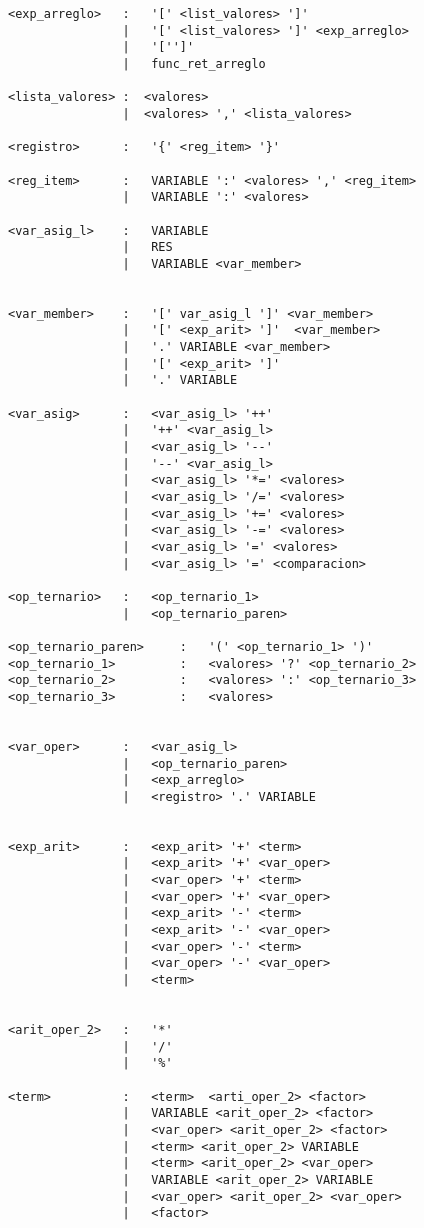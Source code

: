 \begin{verbatim}
<exp_arreglo>   :   '[' <list_valores> ']'
                |   '[' <list_valores> ']' <exp_arreglo>
                |   '['']'
                |   func_ret_arreglo

<lista_valores> :  <valores>
                |  <valores> ',' <lista_valores>

<registro>      :   '{' <reg_item> '}'

<reg_item>      :   VARIABLE ':' <valores> ',' <reg_item>
                |   VARIABLE ':' <valores> 

<var_asig_l>    :   VARIABLE
                |   RES
                |   VARIABLE <var_member>


<var_member>    :   '[' var_asig_l ']' <var_member>
                |   '[' <exp_arit> ']'  <var_member>
                |   '.' VARIABLE <var_member>
                |   '[' <exp_arit> ']' 
                |   '.' VARIABLE 

<var_asig>      :   <var_asig_l> '++'
                |   '++' <var_asig_l>
                |   <var_asig_l> '--'
                |   '--' <var_asig_l>
                |   <var_asig_l> '*=' <valores>
                |   <var_asig_l> '/=' <valores>
                |   <var_asig_l> '+=' <valores>
                |   <var_asig_l> '-=' <valores>
                |   <var_asig_l> '=' <valores>
                |   <var_asig_l> '=' <comparacion>

<op_ternario>   :   <op_ternario_1>
                |   <op_ternario_paren>
                
<op_ternario_paren>     :   '(' <op_ternario_1> ')'
<op_ternario_1>         :   <valores> '?' <op_ternario_2>
<op_ternario_2>         :   <valores> ':' <op_ternario_3>
<op_ternario_3>         :   <valores>


<var_oper>      :   <var_asig_l>
                |   <op_ternario_paren>
                |   <exp_arreglo>
                |   <registro> '.' VARIABLE 

 
<exp_arit>      :   <exp_arit> '+' <term>
                |   <exp_arit> '+' <var_oper>
                |   <var_oper> '+' <term>
                |   <var_oper> '+' <var_oper>
                |   <exp_arit> '-' <term>
                |   <exp_arit> '-' <var_oper>
                |   <var_oper> '-' <term>
                |   <var_oper> '-' <var_oper>
                |   <term>


<arit_oper_2>   :   '*'
                |   '/'
                |   '%'

<term>          :   <term>  <arti_oper_2> <factor>
                |   VARIABLE <arit_oper_2> <factor>
                |   <var_oper> <arit_oper_2> <factor>
                |   <term> <arit_oper_2> VARIABLE
                |   <term> <arit_oper_2> <var_oper>
                |   VARIABLE <arit_oper_2> VARIABLE
                |   <var_oper> <arit_oper_2> <var_oper> 
                |   <factor>


\end{verbatim}
